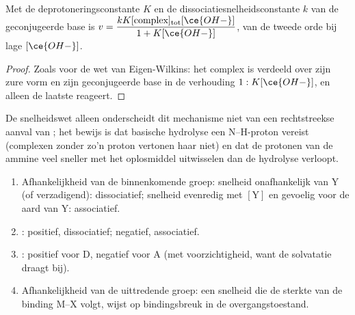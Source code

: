 \begin{proposition}\label{prop:b3:complex-mechanisms:conjugate-base}
Met de deprotoneringsconstante $K$ en de dissociatiesnelheidsconstante $k$
van de geconjugeerde base is $v = \dfrac{kK[\text{complex}]_{\mathrm{tot}}[\ce{OH-}]}{1 + K[\ce{OH-}]}$, van de tweede orde bij lage $[\ce{OH-}]$.
\end{proposition}

\begin{proof}
Zoals voor de wet van Eigen-Wilkins: het complex is verdeeld over zijn
zure vorm en zijn geconjugeerde base in de verhouding $1 : K[\ce{OH-}]$, en alleen de laatste reageert.
\end{proof}

De snelheidswet alleen onderscheidt dit mechanisme niet van een
rechtstreekse aanval van
; het bewijs is dat basische hydrolyse een N--H-proton vereist (complexen zonder
zo'n proton vertonen haar niet) en dat de protonen van de ammine veel
sneller met het oplosmiddel uitwisselen dan de hydrolyse verloopt.

\begin{method}\label{met:b3:complex-mechanisms:diagnose}
\begin{enumerate}
  \item Afhankelijkheid van de binnenkomende groep: snelheid onafhankelijk
        van Y (of verzadigend): dissociatief; snelheid evenredig met $[\mathrm Y]$ en gevoelig voor de aard van Y:
        associatief.
  \item {}: positief, dissociatief; negatief, associatief.
  \item {}: positief voor D, negatief voor A (met
        voorzichtigheid, want de solvatatie draagt bij).
  \item Afhankelijkheid van de uittredende groep: een snelheid die de
        sterkte van de binding M--X volgt, wijst op bindingsbreuk in de
        overgangstoestand.
\end{enumerate}
\end{method}

